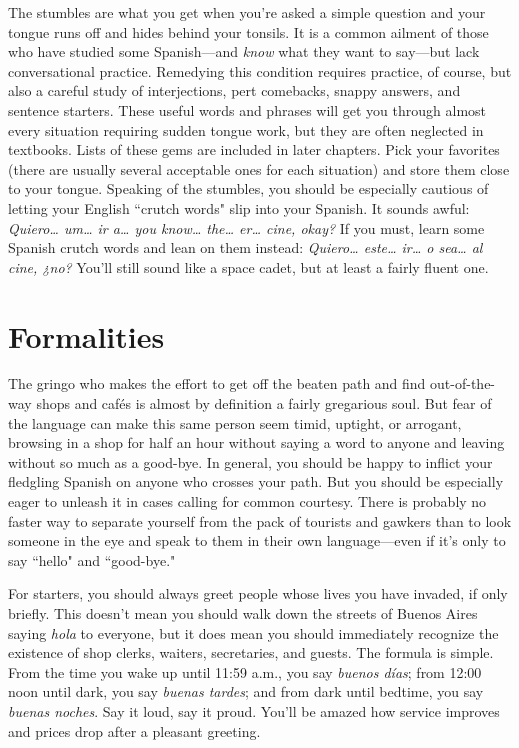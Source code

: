 The stumbles are what you get when you're asked a simple
question and your tongue runs off and hides behind your tonsils. It is a
common ailment of those who have studied some Spanish---and \emph{know}
what they want to say---but lack conversational practice. Remedying
this condition requires practice, of course, but also a careful study of
interjections, pert comebacks, snappy answers, and sentence starters.
These useful words and phrases will get you through almost every
situation requiring sudden tongue work, but they are often neglected
in textbooks. Lists of these gems are included in later chapters. Pick
your favorites (there are usually several acceptable ones for each situation) and store them close to your tongue.
Speaking of the stumbles, you should be especially cautious of
letting your English ``crutch words" slip into your Spanish. It sounds
awful: \emph{Quiero\ldots{} um\ldots{} ir a\ldots{} you know\ldots{} the\ldots{} er\ldots{} cine,
	okay?} If you must, learn some Spanish crutch words and lean on them
instead: \emph{Quiero\ldots{} este\ldots{} ir\ldots{} o sea\ldots{} al cine, ¿no?} You'll still
sound like a space cadet, but at least a fairly fluent one.

\section{Formalities}

The gringo who makes the effort to get off the beaten path and
find out-of-the-way shops and cafés is almost by definition a fairly gregarious soul. But fear of the language can make this same person seem
timid, uptight, or arrogant, browsing in a shop for half an hour without
saying a word to anyone and leaving without so much as a good-bye. In
general, you should be happy to inflict your fledgling Spanish on anyone who crosses your path. But you should be especially eager to unleash it in cases calling for common courtesy. There is probably no
faster way to separate yourself from the pack of tourists and gawkers
than to look someone in the eye and speak to them in their own language---even if it's only to say ``hello" and ``good-bye."

For starters, you should always greet people whose lives you
have invaded, if only briefly. This doesn't mean you should walk down
the streets of Buenos Aires saying \emph{hola} to everyone, but it does mean
you should immediately recognize the existence of shop clerks, waiters, secretaries, and guests. The formula is simple. From the time you
wake up until 11:59 a.m., you say \emph{buenos días}; from 12:00 noon until
dark, you say \emph{buenas tardes}; and from dark until bedtime, you say
\emph{buenas noches}. Say it loud, say it proud. You'll be amazed how service
improves and prices drop after a pleasant greeting.

